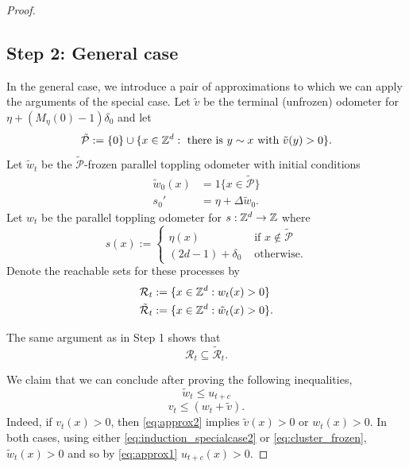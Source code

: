 \documentclass[12pt]{amsart}
\begin{document}
\begin{proof}
	\subsection*{Step 2: General case}
	In the general case, we introduce a pair of approximations to which we can apply the arguments of the special case. Let $\tilde{v}$ be the terminal (unfrozen) odometer for $\eta + (M_{\eta}(0)-1)  \delta_0$ and let
	\begin{equation} \label{eq:penultimate_touched}
	\tilde{\mathcal{P}} := \{0\} \cup \{ x \in \mathbb{Z}^d : \mbox{ there is $y \sim x$ with $\tilde{v}(y) > 0 $}\}.
	\end{equation}
	Let $\tilde{w}_t$ be the $\tilde{\mathcal{P}}$-frozen parallel toppling odometer with initial conditions  
	\begin{equation} \label{eq:cluster_frozen}
	\begin{aligned}
	\tilde{w}_0(x) &= 1 \{ x \in \tilde{\mathcal{P}} \} \\
	s_0' &= \eta + \Delta \tilde{w}_0.
	\end{aligned}
	\end{equation}
	Let $w_t$ be the parallel toppling odometer for $s: \mathbb{Z}^d \to \mathbb{Z}$ where 
	\begin{equation}
	s(x) := 
	\begin{cases}
	\eta(x) &\mbox{ if $x \not \in \tilde{\mathcal{P}}$}  \\
	(2 d - 1) + \delta_0  &\mbox{ otherwise}.
	\end{cases}
	\end{equation}
	Denote the reachable sets for these processes by
	\begin{equation}
	\begin{aligned} 
	\mathcal{R}_t &:= \{ x \in \mathbb{Z}^d : w_t(x) > 0 \} \\
	\tilde{\mathcal{R}}_t &:= \{x \in \mathbb{Z}^d : \tilde{w}_t(x) > 0\}.
	\end{aligned}
	\end{equation}
	
	The same argument as in Step 1 shows that
	\begin{equation} \label{eq:induction_specialcase2}
	\mathcal{R}_t \subseteq \tilde{\mathcal{R}}_t.
	\end{equation}
	
	We claim that we can conclude after proving the following inequalities, 
	\begin{equation} \label{eq:approx1}
	\tilde{w}_t \leq u_{t + c}
	\end{equation}
	\begin{equation} \label{eq:approx2}
	v_{t} \leq \left( w_{t} + \tilde{v}\right).
	\end{equation}
	Indeed, if $v_t(x) > 0$, then \eqref{eq:approx2} implies $\tilde{v}(x) > 0$ or $w_{t}(x) > 0$. In both cases, 
	using either \eqref{eq:induction_specialcase2} or \eqref{eq:cluster_frozen},
	$\tilde{w}_t(x) > 0$ and so by \eqref{eq:approx1} $u_{t+c}(x) > 0$.
	

\end{proof}
\end{document}
